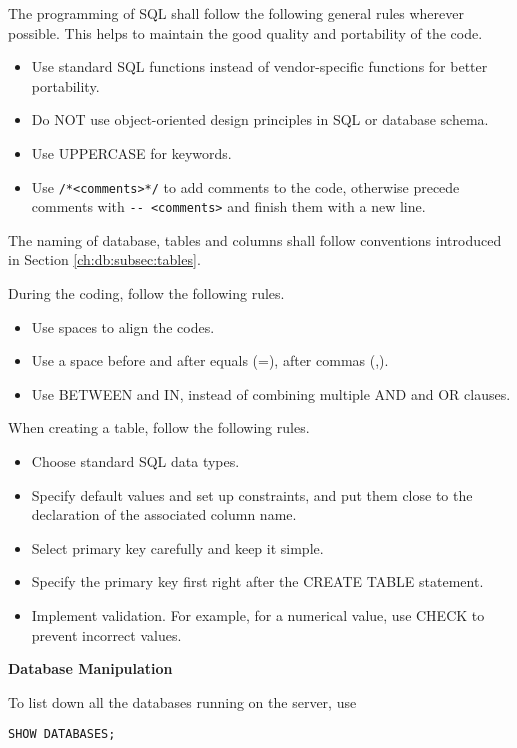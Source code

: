 The programming of SQL shall follow the following general rules wherever possible. This helps to maintain the good quality and portability of the code.
\begin{itemize}
	\item Use standard SQL functions instead of vendor-specific functions for better portability.
	\item Do NOT use object-oriented design principles in SQL or database schema.
	\item Use UPPERCASE for keywords.
	\item Use \verb|/*<comments>*/| to add comments to the code, otherwise precede comments with \verb|-- <comments>| and finish them with a new line.
\end{itemize}

The naming of database, tables and columns shall follow conventions introduced in Section \ref{ch:db:subsec:tables}.

During the coding, follow the following rules.
\begin{itemize}
	\item Use spaces to align the codes.
	\item Use a space before and after equals (=), after commas (,).
	\item Use BETWEEN and IN, instead of combining multiple AND and OR clauses.
\end{itemize}

When creating a table, follow the following rules.
\begin{itemize}
	\item Choose standard SQL data types.
	\item Specify default values and set up constraints, and put them close to the declaration of the associated column name.
	\item Select primary key carefully and keep it simple.
	\item Specify the primary key first right after the CREATE TABLE statement.
	\item Implement validation. For example, for a numerical value, use CHECK to prevent incorrect values.
\end{itemize}

\vspace{0.1in}
\noindent \textbf{Database Manipulation}
\vspace{0.1in}

To list down all the databases running on the server, use
\begin{lstlisting}
SHOW DATABASES;
\end{lstlisting}

